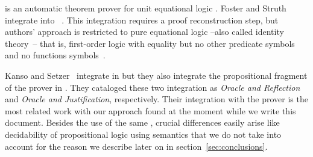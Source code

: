 \documentclass[main.tex]{subfiles}
\begin{document}


 is an automatic theorem prover for unit equational
logic \cite{hillenbrand1997}.
Foster and Struth~\cite{foster2011integrating} integrate  into
\Agda~\cite{agdateam}. This integration requires a proof
reconstruction step, but authors' approach is restricted to pure
equational logic --also called identity theory~\cite{humberstone2011}--
that is, first-order logic with equality but no other predicate symbols
and no functions symbols~\cite{appel1959}.

Kanso and Setzer~\cite{kanso2016light} integrate  in \Agda
but they also integrate the propositional fragment of the  prover in
\cite{Kanso2012}. They cataloged these two integration as
\emph{Oracle and Reflection} and \emph{Oracle and Justification}, respectively.
Their integration with the  prover is the most related work with our
approach found at the moment while we write this document. Besides the use
of the same \ITP, crucial differences easily arise like decidability of
propositional logic using semantics that we do not take into account for the
reason we describe later on in section~\ref{sec:conclusions}.
\end{document}
